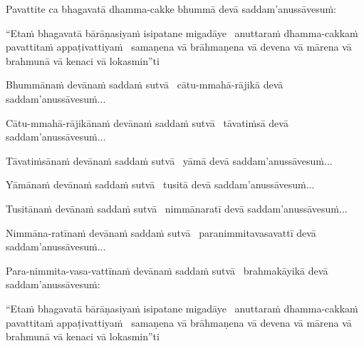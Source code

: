 \begin{pali-hang}
  Pavattite ca bhagavatā dhamma-cakke bhummā devā saddam'anussāvesuṁ:
\end{pali-hang}

\begin{pali-hang}
  ``Etaṁ bhagavatā bārāṇasiyaṁ isipatane migadāye \breathmark\ anuttaraṁ dhamma-cakkaṁ pavattitaṁ appaṭivattiyaṁ \breathmark\ samaṇena vā brāhmaṇena vā devena vā mārena vā brahmunā vā kenaci vā lokasmin''ti
\end{pali-hang}

\begin{pali-hang}
  Bhummānaṁ devānaṁ saddaṁ sutvā \breathmark\ cātu-mmahā-rājikā devā saddam'anussāvesuṁ...
\end{pali-hang}

\begin{pali-hang}
  Cātu-mmahā-rājikānaṁ devānaṁ saddaṁ sutvā \breathmark\ tāvatiṁsā devā saddam'anussāvesuṁ...
\end{pali-hang}

\begin{pali-hang}
  Tāvatiṁsānaṁ devānaṁ saddaṁ sutvā \breathmark\ yāmā devā saddam'anussāvesuṁ...
\end{pali-hang}

\begin{pali-hang}
  Yāmānaṁ devānaṁ saddaṁ sutvā \breathmark\ tusitā devā saddam'anussāvesuṁ...
\end{pali-hang}

\begin{pali-hang}
  Tusitānaṁ devānaṁ saddaṁ sutvā \breathmark\ nimmānaratī devā saddam'anussāvesuṁ...
\end{pali-hang}

\begin{pali-hang}
  Nimmāna-ratīnaṁ devānaṁ saddaṁ sutvā \breathmark\ paranimmitavasavattī devā saddam'anussāvesuṁ...
\end{pali-hang}

\begin{pali-hang}
  Para-nimmita-vasa-vattīnaṁ devānaṁ saddaṁ sutvā \breathmark\ brahmakāyikā devā saddam'anussāvesuṁ:
\end{pali-hang}

\begin{pali-hang}
  ``Etaṁ bhagavatā bārāṇasiyaṁ isipatane migadāye \breathmark\ anuttaraṁ dhamma-cakkaṁ pavattitaṁ appaṭivattiyaṁ \breathmark\ samaṇena vā brāhmaṇena vā devena vā mārena vā brahmunā vā kenaci vā lokasmin''ti
\end{pali-hang}

